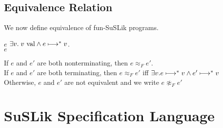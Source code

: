 \documentclass[10pt]{article}
\begin{document}
\subsection{Equivalence Relation}
\label{sec:FSEquiv}
We now define equivalence of fun-SuSLik programs.

\begin{definition}[Termination]
  $e$  $\exists v.\; v \textnormal{ val} \land e \longmapsto^{*} v$.\\
  $e$ 
\end{definition}

\begin{definition}
  If $e$ and $e'$ are both nonterminating, then $e \approx_F e'$.\\
  If $e$ and $e'$ are both terminating, then $e \approx_F e'$ iff $\exists v. e \longmapsto^{*} v \land e' \longmapsto^{*} v$\\
  Otherwise, $e$ and $e'$ are not equivalent and we write $e \not\approx_F e'$
\end{definition}

\section{SuSLik Specification Language}
\label{sec:SuSLikDef}
\end{document}
